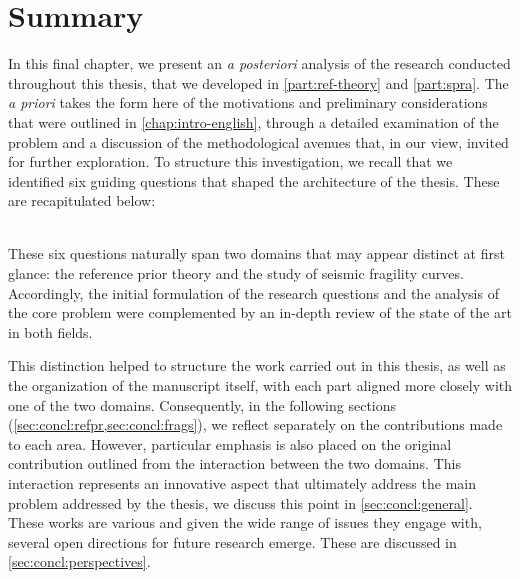 \section{Summary}




In this final chapter, we present an \emph{a posteriori} analysis of the research conducted throughout this thesis, that we developed in \cref{part:ref-theory} and \cref{part:spra}. The \emph{a priori} takes the form here of the 
motivations and preliminary considerations that were outlined in \cref{chap:intro-english}, through a detailed examination of the problem and a discussion of the methodological avenues that, in our view, invited for further exploration.
To structure this investigation, we recall that we identified six guiding questions that shaped the architecture of the thesis. These are recapitulated below:\\[-5pt]









\\[1pt]

These six questions naturally span two domains that may appear distinct at first glance: the reference prior theory and the study of seismic fragility curves. Accordingly, the initial formulation of the research questions and the analysis of the core problem were complemented by an in-depth review of the state of the art in both fields.

This distinction helped to structure the work carried out in this thesis, as well as the organization of the manuscript itself, with each part aligned more closely with one of the two domains. Consequently, in the following sections (\cref{sec:concl:refpr,sec:concl:frags}), we reflect separately on the contributions made to each area. However, particular emphasis is also placed on the original contribution outlined from the interaction between the two domains. This interaction represents an innovative aspect that ultimately address the main problem addressed by the thesis, we discuss this point in \cref{sec:concl:general}.
These works are various and given the wide range of issues they engage with, several open directions for future research emerge. These are discussed in \cref{sec:concl:perspectives}.




